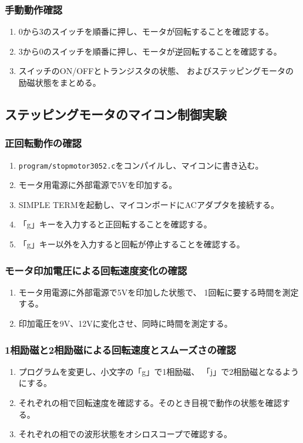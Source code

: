 \documentclass[10pt,a4paper]{jarticle}
\begin{document}
\subsubsection{手動動作確認}
\begin{enumerate}
 \item 0から3のスイッチを順番に押し、モータが回転することを確認する。
 \item 3から0のスイッチを順番に押し、モータが逆回転することを確認する。
 \item スイッチのON/OFFとトランジスタの状態、
 およびステッピングモータの励磁状態をまとめる。
\end{enumerate}
\subsection{ステッピングモータのマイコン制御実験}
\subsubsection{正回転動作の確認}
\begin{enumerate}
 \item \verb|program/stopmotor3052.c|をコンパイルし、マイコンに書き込む。
 \item モータ用電源に外部電源で5Vを印加する。
 \item SIMPLE TERMを起動し、マイコンボードにACアダプタを接続する。
 \item 「g」キーを入力すると正回転することを確認する。
 \item 「g」キー以外を入力すると回転が停止することを確認する。
\end{enumerate}
\subsubsection{モータ印加電圧による回転速度変化の確認}
\begin{enumerate}
 \item モータ用電源に外部電源で5Vを印加した状態で、
 1回転に要する時間を測定する。
 \item 印加電圧を9V、12Vに変化させ、同時に時間を測定する。
\end{enumerate}
\subsubsection{1相励磁と2相励磁による回転速度とスムーズさの確認}
\begin{enumerate}
 \item プログラムを変更し、小文字の「g」で1相励磁、
 「j」で2相励磁となるようにする。
 \item それぞれの相で回転速度を確認する。そのとき目視で動作の状態を確認する。
 \item それぞれの相での波形状態をオシロスコープで確認する。
\end{enumerate}
\end{document}
